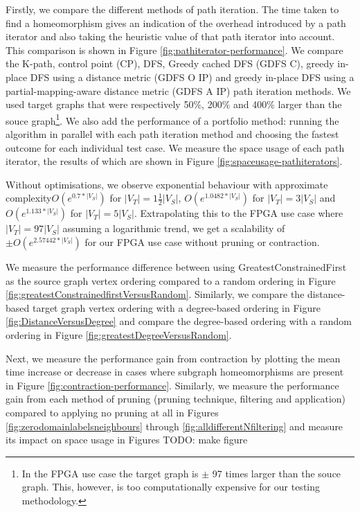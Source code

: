 Firstly, we compare the different methods of path iteration. The time taken to find a homeomorphism gives an indication of the overhead introduced by a path iterator and also taking the heuristic value of that path iterator into account. This comparison is shown in Figure \ref{fig:pathiterator-performance}. We compare the K-path, control point (CP), DFS, Greedy cached DFS (GDFS C), greedy in-place DFS using a distance metric (GDFS O IP) and greedy in-place DFS using a partial-mapping-aware distance metric (GDFS A IP) path iteration methods. We used target graphs that were respectively 50\%, 200\% and 400\% larger than the souce graph\footnote{In the FPGA use case the target graph is $\pm$ 97 times larger than the souce graph. This, however, is too computationally expensive for our testing methodology.}. We also add the performance of a portfolio method: running the algorithm in parallel with each path iteration method and choosing the fastest outcome for each individual test case. We measure the space usage of each path iterator, the results of which are shown in Figure \ref{fig:spaceusage-pathiterators}.

Without optimisations, we observe exponential behaviour with approximate complexity$O(e^{0.7*|V_S|})$ for $|V_T|=1\frac{1}{2}|V_S|$, $O(e^{1.0482*|V_S|})$ for $|V_T|=3|V_S|$ and $O(e^{1.133*|V_S|})$ for $|V_T|=5|V_S|$. Extrapolating this to the FPGA use case where $|V_T|=97|V_S|$ assuming a logarithmic trend, we get a scalability of $\pm O(e^{2.57442*|V_S|})$ for our FPGA use case without pruning or contraction.

We measure the performance difference between using GreatestConstrainedFirst as the source graph vertex ordering compared to a random ordering in Figure \ref{fig:greatestConstrainedfirstVersusRandom}. Similarly, we compare the distance-based target graph vertex ordering with a degree-based ordering in Figure \ref{fig:DistanceVersusDegree} and compare the degree-based ordering with a random ordering in Figure \ref{fig:greatestDegreeVersusRandom}.

Next, we measure the performance gain from contraction by plotting the mean time increase or decrease in cases where subgraph homeomorphisms are present in Figure \ref{fig:contraction-performance}. Similarly, we measure the performance gain from each method of pruning (pruning technique, filtering and application) compared to applying no pruning at all in Figures \ref{fig:zerodomainlabelsneighbours} through \ref{fig:alldifferentNfiltering} and measure its impact on space usage in Figures {\color{red} TODO: make figure}

